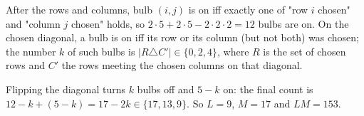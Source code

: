 After the rows and columns, bulb $(i,j)$ is on iff exactly one of "row $i$ chosen" and "column $j$ chosen" holds, so $2\cdot5+2\cdot5-2\cdot2\cdot2=12$ bulbs are on. On the chosen diagonal, a bulb is on iff its row or its column (but not both) was chosen; the number $k$ of such bulbs is $|R\triangle C'|\in\{0,2,4\}$, where $R$ is the set of chosen rows and $C'$ the rows meeting the chosen columns on that diagonal.

Flipping the diagonal turns $k$ bulbs off and $5-k$ on: the final count is $12-k+(5-k)=17-2k\in\{17,13,9\}$. So $L=9$, $M=17$ and $LM=\boxed{153}$.
